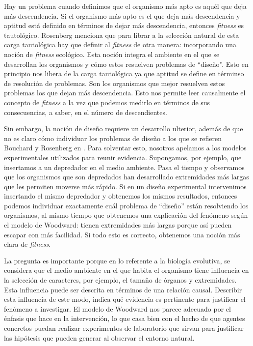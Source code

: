 Hay un problema cuando definimos que el organismo más apto es aquél que deja más descendencia. Si el organismo más apto es el que deja más descendencia y aptitud está definido en términos de dejar más descendencia, entonces \emph{fitness} es tautológico. Rosenberg menciona que para librar a la selección natural de esta carga tautológica hay que definir al \emph{fitness} de otra manera: incorporando una noción de \emph{fitness} ecológico. Esta noción integra el ambiente en el que se desarrollan los organismos y cómo estos resuelven problemas de ``diseño''. Esto en principio nos libera de la carga tautológica ya que aptitud se define en términso de resolución de problemas. Son los organismos que mejor resuelven estos problemas los que dejan más descendencia. Esto nos permite leer causalmente el concepto de \emph{fitness} a la vez que podemos medirlo en términos de sus consecuencias, a saber, en el número de descendientes.

Sin embargo, la noción de diseño requiere un desarrollo ulterior, además de que no es claro cómo individuar los problemas de diseño a los que se refieren Bouchard y Rosenberg en \citeyear{Bouchard2004}. Para solventar esto, nosotros apelamos a los modelos experimentales utilizados para reunir evidencia. Supongamos, por ejemplo, que insertamos a un depredador en el medio ambiente. Pasa el tiempo y observamos que los organismos que son depredados han desarrollado extremidades más largas que les permiten moverse más rápido. Si en un diseño experimental intervenimos insertando el mismo depredador y obtenemos los mismos resultados, entonces podemos individuar exactamente cuál problema de ``diseño'' están resolviendo los organismos, al mismo tiempo que obtenemos una explicación del fenómeno según el modelo de Woodward: tienen extremidades más largas porque así pueden escapar con más facilidad. Si todo esto es correcto, obtenemos una noción más clara de \emph{fitness}.

La pregunta es importante porque en lo referente a la biología evolutiva, se considera que el medio ambiente en el que habita el organismo tiene influencia en la selección de caracteres, por ejemplo, el tamaño de órganos y extremidades. Esta influencia puede ser descrita en términos de una relación causal. Describir esta influencia de este modo, indica qué evidencia es pertinente para justificar el fenómeno a investigar. El modelo de Woodward nos parece adecuado por el énfasis que hace en la intervención, lo que casa bien con el hecho de que agentes concretos puedan realizar experimentos de laboratorio que sirvan para justificar las hipótesis que pueden generar al observar el entorno natural.




